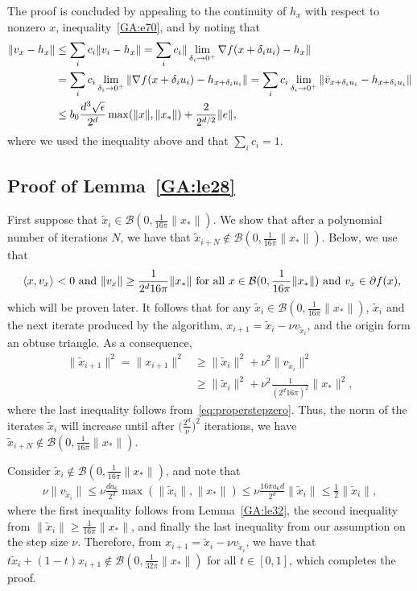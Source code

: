 The proof is concluded by appealing to the continuity of $h_x$ with respect to nonzero $x$, inequality~\eqref{GA:e70}, and by  noting that
\begin{align*}
\|v_x - h_x\|
&\leq \sum_i c_i \|v_i - h_x\|
= \sum_i c_i \|\lim_{\delta_i \rightarrow 0^+} \nabla f(x + \delta_i u_i) - h_x\| \\
&= \sum_i c_i \lim_{\delta_i \rightarrow 0^+} \|\nabla f(x + \delta_i u_i) - h_{x + \delta_i u_i}\| = \sum_i c_i \lim_{\delta_i \rightarrow 0^+} \|\tilde{v}_{x + \delta_i u_i} - h_{x + \delta_i u_i}\| \\
&\leq b_0 \frac{d^3 \sqrt{\eps}}{2^d} \max ( \|x\|, \| x_* \|)
+
\frac{2}{2^{d/2}} \|e\|,
\end{align*}
where we used the inequality above and that $\sum_i c_i = 1$.

\subsection{Proof of Lemma~\ref{GA:le28}}

First suppose that $\tilde{x}_i \in \mathcal{B}(0,\frac{1}{16\pi} \|x_*\|)$.
We show that after a polynomial number of iterations $N$, we have that $\tilde{x}_{i+N} \notin \mathcal{B}(0,\frac{1}{16\pi} \|x_*\|)$.
Below, we use that
\begin{align}
\label{eq:properstepzero}
\text{
$\inner[]{x}{{v}_{x}} < 0$
and
$\|{v}_{x}\| \geq \frac{1}{2^d 16\pi} \|x_*\|$
for all
$x \in \mathcal{B}(0, \frac{1}{16\pi} \|x_*\|)$} \hbox{ and } v_x \in {\partial f(x)},
\end{align}
which will be proven later.
It follows that for any
$\tilde{x}_i \in \mathcal{B}(0, \frac{1}{16\pi} \|x_*\|)$,
$\tilde{x}_i$ and the next iterate produced by the algorithm,
$x_{i+1} = \tilde{x}_i - \nu {v}_{\tilde{x}_i}$, and the origin form an obtuse triangle.
As a consequence,
\begin{align}
\|\tilde{x}_{i + 1}\|^2 = \|x_{i + 1}\|^2
&\geq
\|\tilde{x}_i\|^2 + \nu^2 \|{v}_{\tilde{x}_i}\|^2 \nonumber \\
&\geq
\|\tilde{x}_i\|^2 + \nu^2 \frac{1}{(2^{d} 16\pi)^2} \|x_*\|^2, \label{GA:e73}
\end{align}
where the last inequality follows from~\eqref{eq:properstepzero}.
Thus, the norm of the iterates $\tilde{x}_i$ will increase until after $\bigl(\frac{2^d}{\nu} \bigr)^2$  iterations, we have $\tilde{x}_{i+N} \notin \mathcal{B}(0, \frac{1}{16\pi} \|x_*\|)$.

Consider $\tilde{x}_i \notin \mathcal{B}(0, \frac{1}{16\pi} \|x_*\|)$, and note that
\begin{align*}
\nu \|{v}_{\tilde{x}_i}\| \leq \nu \frac{d a_6}{2^d} \max(\|\tilde{x}_i\|, \|x_*\|) \leq \nu\frac{16 \pi a_6 d}{2^d}\|\tilde{x}_i\| \leq \frac{1}{2}\|\tilde{x}_i\|,
\end{align*}
where the first inequality follows from Lemma~\ref{GA:le32}, the second inequality from $\|\tilde{x}_i\| \geq \frac{1}{16\pi} \|x_*\|$, and finally the last inequality from our assumption on the step size $\nu$. Therefore, from $x_{i + 1} = \tilde{x}_i - \nu {v}_{\tilde{x}_i}$, we have that $t \tilde{x}_i + (1 - t) x_{i+1} \notin \mathcal{B}(0, \frac{1}{32 \pi} \|x_*\|)$ for all $t \in [0, 1]$, which completes the proof.

